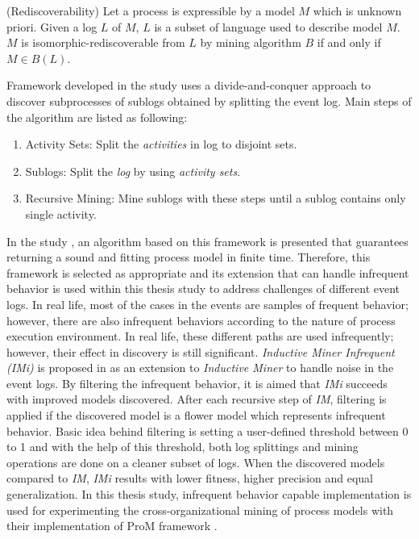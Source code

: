 \theoremstyle{definition}
\begin{definition}{}
(Rediscoverability) Let a process is expressible by a model $M$ which is unknown priori. Given a log $L$ of $M$, $L$ is a subset of language used to describe model $M$. $M$ is isomorphic-rediscoverable from $L$ by mining algorithm $B$ if and only if $M \in B(L)$.
\end{definition}
 
Framework developed in the study \cite{leemans2013discovering} uses a divide-and-conquer approach to discover subprocesses of sublogs obtained by splitting the event log. Main steps of the algorithm are listed as following:
\begin{enumerate}
  \item Activity Sets: Split the \textit{activities} in log to disjoint sets.
  \item Sublogs: Split the \textit{log} by using \textit{activity sets}.
  \item Recursive Mining: Mine sublogs with these steps until a sublog contains only single activity.
\end{enumerate}

In the study \cite{leemans2013discovering}, an algorithm based on this framework is presented that guarantees returning a sound and fitting process model in finite time. Therefore, this framework is selected as appropriate and its extension that can handle infrequent behavior is used within this thesis study to address challenges of different event logs. In real life, most of the cases in the events are samples of frequent behavior; however, there are also infrequent behaviors according to the nature of process execution environment. In real life, these different paths are used infrequently; however, their effect in discovery is still significant. \textit{Inductive Miner Infrequent (IMi)} is proposed in \cite{leemans2014discoveringinfrequent} as an extension to \textit{Inductive Miner} to handle noise in the event logs. By filtering the infrequent behavior, it is aimed that \textit{IMi} succeeds with improved models discovered. After each recursive step of \textit{IM}, filtering is applied if the discovered model is a flower model which represents infrequent behavior. Basic idea behind filtering is setting a user-defined threshold between 0 to 1 and with the help of this threshold, both log splittings and mining operations are done on a cleaner subset of logs. When the discovered models compared to \textit{IM}, \textit{IMi} results with lower fitness, higher precision and equal generalization.
In this thesis study, infrequent behavior capable implementation is used for experimenting the cross-organizational mining of process models with their implementation of ProM framework \cite{verbeek2010prom}.

